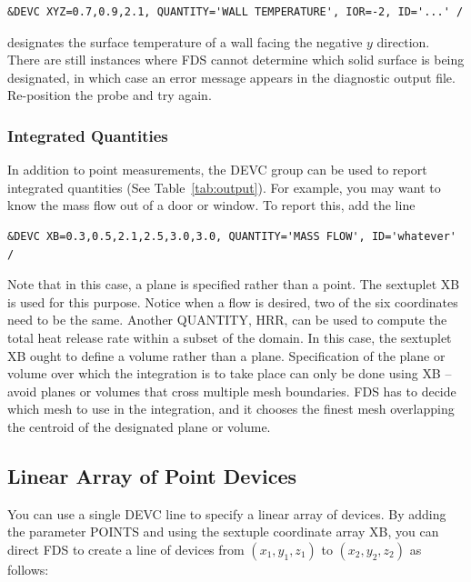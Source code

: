 \documentclass[11pt]{book}
\begin{document}
\begin{lstlisting}
&DEVC XYZ=0.7,0.9,2.1, QUANTITY='WALL TEMPERATURE', IOR=-2, ID='...' /
\end{lstlisting}

\noindent
designates the surface temperature of a wall facing the negative $y$
direction. There are still instances where FDS cannot
determine which solid surface is being designated, in which case an
error message appears in the diagnostic output file.
Re-position the probe and try again.

\subsubsection{Integrated Quantities}

In addition to point measurements, the {\ct DEVC} group can be used
to report integrated quantities (See Table~\ref{tab:output}).
For example, you may want to know the mass flow out of a door or window.
To report this, add the line

\begin{lstlisting}
&DEVC XB=0.3,0.5,2.1,2.5,3.0,3.0, QUANTITY='MASS FLOW', ID='whatever' /
\end{lstlisting}

\noindent
Note that in this case, a plane is specified rather than
a point. The sextuplet {\ct XB} is used for this purpose. Notice when a
flow is desired, two of the six coordinates need to be the same. Another
{\ct QUANTITY}, {\ct HRR}, can be used to compute the total heat release
rate within a subset of the domain. In this case, the sextuplet
{\ct XB} ought to define a volume rather than a plane. Specification of
the plane or volume over which the integration is to take place can only
be done using {\ct XB} -- avoid planes or volumes
that cross multiple mesh boundaries. FDS has to decide which mesh to
use in the integration, and it chooses the finest mesh overlapping
the centroid of the designated plane or volume.



\subsection{Linear Array of Point Devices}
\label{info:line_file}

You can use a single {\ct DEVC} line to specify a linear array of devices. By adding the parameter {\ct POINTS} and using the
sextuple coordinate array {\ct XB}, you can direct FDS to create a line of devices from $(x_1,y_1,z_1)$ to $(x_2,y_2,z_2)$ as follows:
\end{document}
